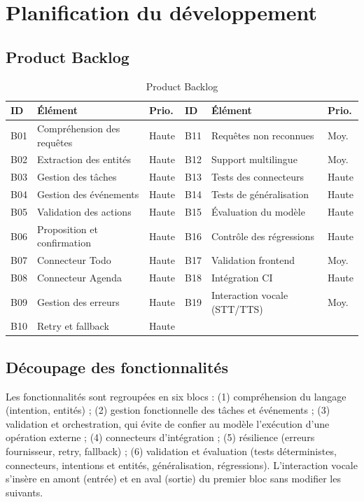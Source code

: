 \documentclass[11pt,a4paper,openany,oneside]{report}
\begin{document}
\section{Planification du développement}
\subsection{Product Backlog}
\begin{table}[htbp]
\centering\small
\caption{Product Backlog}\label{tab:backlog}
\begin{tabularx}{\textwidth}{@{}lXl@{\hspace{8pt}}lXl@{}}
\toprule
\textbf{ID} & \textbf{Élément} & \textbf{Prio.} & \textbf{ID} & \textbf{Élément} & \textbf{Prio.} \\
\midrule
B01 & Compréhension des requêtes & Haute & B11 & Requêtes non reconnues & Moy. \\
B02 & Extraction des entités & Haute & B12 & Support multilingue & Moy. \\
B03 & Gestion des tâches & Haute & B13 & Tests des connecteurs & Haute \\
B04 & Gestion des événements & Haute & B14 & Tests de généralisation & Haute \\
B05 & Validation des actions & Haute & B15 & Évaluation du modèle & Haute \\
B06 & Proposition et confirmation & Haute & B16 & Contrôle des régressions & Haute \\
B07 & Connecteur Todo & Haute & B17 & Validation frontend & Moy. \\
B08 & Connecteur Agenda & Haute & B18 & Intégration CI & Haute \\
B09 & Gestion des erreurs & Haute & B19 & Interaction vocale (STT/TTS) & Moy. \\
B10 & Retry et fallback & Haute & & & \\
\bottomrule
\end{tabularx}
\end{table}

\subsection{Découpage des fonctionnalités}
Les fonctionnalités sont regroupées en six blocs : (1) compréhension du langage (intention, entités) ; (2) gestion fonctionnelle des tâches et événements ; (3) validation et orchestration, qui évite de confier au modèle l'exécution d'une opération externe ; (4) connecteurs d'intégration ; (5) résilience (erreurs fournisseur, retry, fallback) ; (6) validation et évaluation (tests déterministes, connecteurs, intentions et entités, généralisation, régressions). L'interaction vocale s'insère en amont (entrée) et en aval (sortie) du premier bloc sans modifier les suivants.
\end{document}
